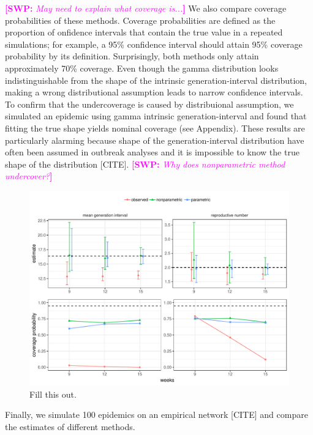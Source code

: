 \documentclass[12pt]{article}
\newcommand{\comment}[3]{\textcolor{#1}{\textbf{[#2: }\textsl{#3}\textbf{]}}}
\newcommand{\swp}[1]{\comment{magenta}{SWP}{#1}}
\begin{document}
\swp{May need to explain what coverage is...}
We also compare coverage probabilities of these methods. 
Coverage probabilities are defined as the proportion of onfidence intervals that contain the true value in a repeated simulations; for example, a 95\% confidence interval should attain 95\% coverage probability by its definition.
Surprisingly, both methods only attain approximately 70\% coverage.
Even though the gamma distribution looks indistinguishable from the shape of the intrinsic generation-interval distribution, making a wrong distributional assumption leads to narrow confidence intervals.
To confirm that the undercoverage is caused by distribuional assumption, we simulated an epidemic using gamma intrinsic generation-interval and found that fitting the true shape yields nominal coverage (see Appendix).
These results are particularly alarming because shape of the generation-interval distribution have often been assumed in outbreak analyses and it is impossible to know the true shape of the distribution [CITE].
\swp{Why does nonparametric method undercover?}

\begin{figure}
\includegraphics[width=\textwidth]{../fig/compare_methods.pdf}
\caption{Fill this out.}
\label{fig:test}
\end{figure}

Finally, we simulate 100 epidemics on an empirical network [CITE] and compare the estimates of different methods.





\clearpage
\end{document}
